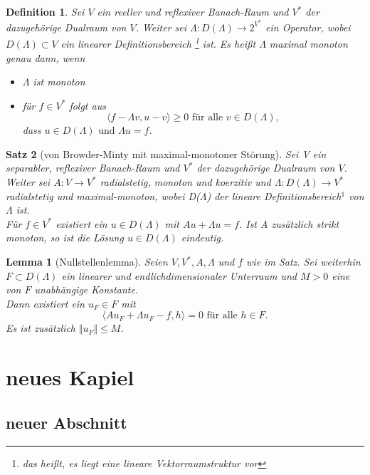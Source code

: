 \documentclass[a4paper]{article}
\newcommand{\V}{V^{\ast}}
\newtheorem{lemma}{Lemma}[section]
\newtheorem{satz}{Satz}[subsection]
\newtheorem{definition}[satz]{Definition}
\begin{document}
\begin{definition}
Sei $V$ ein reeller und reflexiver Banach-Raum und $\V$ der dazugehörige Dualraum von $V$. Weiter sei $\Lambda \colon D(\Lambda) \to 2^{\V} $ ein Operator, wobei $D(\Lambda) \subset V $ ein linearer Definitionsbereich \footnote{das heißt, es liegt eine lineare Vektorraumstruktur vor} ist. Es heißt $\Lambda$ maximal monoton genau dann, wenn 
\begin{itemize}
\item[i)] $\Lambda$ ist monoton
\item[ii)] für $f \in V^{\ast}$ folgt aus 
$$ \langle f - \Lambda v, u - v \rangle \geq 0  \text{ für alle } v \in D(\Lambda), $$ 
dass $ u \in D(\Lambda) \text{ und } \Lambda u = f $. %
\end{itemize}
\end{definition}

\begin{satz}[von Browder-Minty mit maximal-monotoner Störung]
Sei V ein separabler, reflexiver Banach-Raum und $\V$ der dazugehörige Dualraum von $V$. Weiter sei $A \colon V \to V^{\ast}$ radialstetig, monoton und koerzitiv und $\Lambda \colon D(\Lambda) \to V^{\ast}$ radialstetig und maximal-monoton, wobei D($\Lambda$) der lineare Definitionsbereich$^1$ von $\Lambda$ ist. \\
Für $f \in V^{\ast}$ existiert ein $u \in D(\Lambda) $ mit $Au + \Lambda u = f$. Ist A zusätzlich strikt monoton, so ist die Lösung $u \in D(\Lambda)$ eindeutig. 
\end{satz} 

\begin{lemma}[Nullstellenlemma]  %
Seien $V, \V, A, \Lambda$ und $ f $ wie im Satz. Sei weiterhin $ F \subset D(\Lambda) $ ein linearer und endlichdimensionaler Unterraum und $M > 0 $ eine von $F$ unabhängige Konstante.\\
Dann existiert ein $u_F \in F $ mit $$ \langle A u_F + \Lambda u_F - f , h \rangle = 0 \text{ für alle } h \in F .$$
Es ist zusätzlich $\Vert u_F  \Vert \leq M $.
\end{lemma}
\section{neues Kapiel}
\subsection{neuer Abschnitt}
\end{document}
